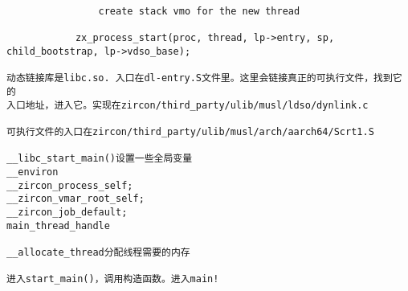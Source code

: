 \begin{verbatim}
                create stack vmo for the new thread

            zx_process_start(proc, thread, lp->entry, sp, child_bootstrap, lp->vdso_base);

动态链接库是libc.so. 入口在dl-entry.S文件里。这里会链接真正的可执行文件，找到它的
入口地址，进入它。实现在zircon/third_party/ulib/musl/ldso/dynlink.c

可执行文件的入口在zircon/third_party/ulib/musl/arch/aarch64/Scrt1.S

__libc_start_main()设置一些全局变量
__environ
__zircon_process_self;
__zircon_vmar_root_self;
__zircon_job_default;
main_thread_handle

__allocate_thread分配线程需要的内存

进入start_main()，调用构造函数。进入main!























\end{verbatim}    